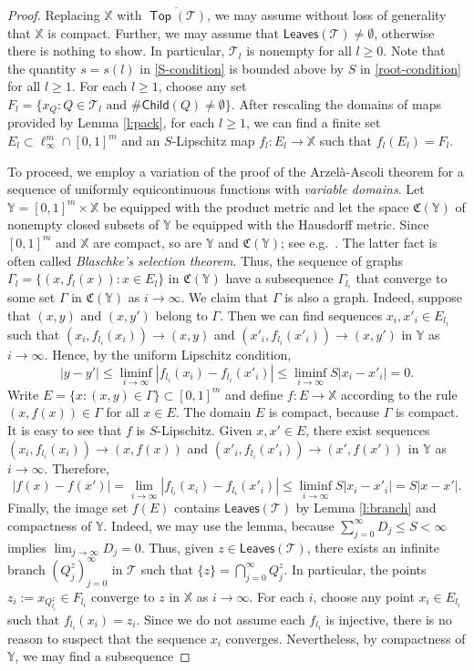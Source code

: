 \documentclass[12pt]{amsart}
\theoremstyle{definition}
\theoremstyle{remark}
\newcommand{\XX}{\mathbb{X}}
\newcommand{\YY}{\mathbb{Y}}
\newcommand{\leaves}{\mathsf{Leaves}}
\newcommand{\Child}{\mathsf{Child}}
\newcommand{\Top}{\mathop\mathsf{Top}}
\numberwithin{figure}{section}
\numberwithin{equation}{section}
\begin{document}
\begin{proof} Replacing $\XX$ with $\overline{\Top(\mathcal{T})}$, we may assume without loss of generality that $\XX$ is compact. Further, we may assume that $\leaves(\mathcal{T})\neq\emptyset$, otherwise there is nothing to show. In particular, $\mathcal{T}_l$ is nonempty for all $l\geq 0$. Note that the quantity $s=s(l)$ in \eqref{S-condition} is bounded above by $S$ in \eqref{root-condition} for all $l\geq 1$. For each $l\geq 1$, choose any set $F_l=\{x_Q:Q\in\mathcal{T}_l\text{ and }\#\Child(Q)\neq\emptyset\}$. After rescaling the domains of maps provided by Lemma \ref{l:pack}, for each $l\geq 1$, we can find a finite set $E_l\subset \ell^m_\infty\cap [0,1]^m$ and an $S$-Lipschitz map $f_l:E_l\rightarrow \XX$ such that $f_l(E_l)=F_l$.

To proceed, we employ a variation of the proof of the Arzel\`a-Ascoli theorem for a sequence of uniformly equicontinuous functions with \emph{variable domains}. Let $\YY=[0,1]^m\times \XX$ be equipped with the product metric and let the space $\mathfrak{C}(\YY)$ of nonempty closed subsets of $\YY$ be equipped with the Hausdorff metric. Since $[0,1]^m$ and $\XX$ are compact, so are $\YY$ and $\mathfrak{C}(\YY)$; see e.g.~\cite{Beer}. The latter fact is often called \emph{Blaschke's selection theorem}. Thus, the sequence of graphs $\Gamma_l=\{(x,f_l(x)):x\in E_l\}$ in $\mathfrak{C}(\YY)$ have a subsequence $\Gamma_{l_i}$ that converge to some set $\Gamma$ in $\mathfrak{C}(\YY)$ as $i\rightarrow\infty$. We claim that $\Gamma$ is also a graph. Indeed, suppose that $(x,y)$ and $(x,y')$ belong to $\Gamma$. Then we can find sequences $x_i,x'_i\in E_{l_i}$ such that $(x_i,f_{l_i}(x_i))\rightarrow (x,y)$ and $(x'_i,f_{l_i}(x'_i))\rightarrow (x,y')$ in $\YY$ as $i\rightarrow\infty$. Hence, by the uniform Lipschitz condition, $$|y-y'|\leq \liminf_{i\rightarrow\infty} |f_{l_i}(x_i)-f_{l_i}(x'_i)| \leq \liminf_{i\rightarrow\infty} S|x_i-x'_i|=0.$$ Write $E=\{x:(x,y)\in\Gamma\}\subset[0,1]^m$ and define $f:E\rightarrow\XX$ according to the rule $(x,f(x))\in\Gamma$ for all $x\in E$. The domain $E$ is compact, because $\Gamma$ is compact. It is easy to see that $f$ is $S$-Lipschitz. Given $x,x'\in E$, there exist sequences $(x_i,f_{l_i}(x_i))\rightarrow (x,f(x))$ and $(x'_i,f_{l_i}(x'_i))\rightarrow (x',f(x'))$ in $\YY$ as $i\rightarrow\infty$. Therefore,  $$|f(x)-f(x')|=\lim_{i\rightarrow\infty} |f_{l_i}(x_i)-f_{l_i}(x'_i)|\leq \liminf_{i\rightarrow\infty} S|x_i-x'_i|=S|x-x'|.$$ Finally, the image set $f(E)$ contains $\leaves(\mathcal{T})$ by Lemma \ref{l:branch} and compactness of $\YY$. Indeed, we may use the lemma, because $\sum_{j=0}^\infty D_j\leq S<\infty$ implies $\lim_{j\rightarrow \infty} D_j=0$. Thus, given $z\in\leaves(\mathcal{T})$,  there exists an infinite branch $(Q_j^z)_{j=0}^\infty$ in $\mathcal{T}$ such that $\{z\}=\bigcap_{j=0}^\infty Q_j^z$. In particular, the points $z_i:=x_{Q^{z}_{l_i}}\in F_{l_i}$ converge to $z$ in $\XX$ as $i\rightarrow\infty$. For each $i$, choose any point $x_i\in E_{l_i}$ such that $f_{l_i}(x_i)=z_i$. Since we do not assume each $f_{l_i}$ is injective, there is no reason to suspect that the sequence $x_i$ converges. Nevertheless, by compactness of $\YY$, we may find a subsequence 
\end{proof}
\end{document}
